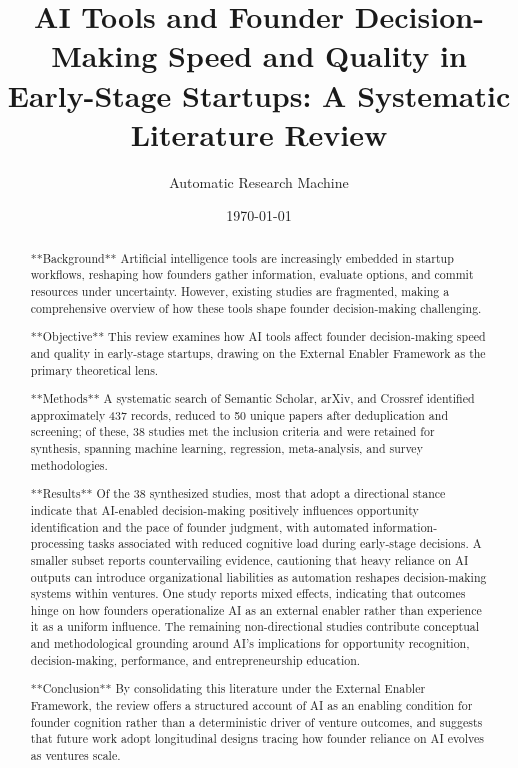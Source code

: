 \documentclass[11pt, a4paper]{article}
\title{AI Tools and Founder Decision-Making Speed and Quality in Early-Stage Startups: A Systematic Literature Review}
\author{Automatic Research Machine}
\date{\today}
\begin{document}
\maketitle

\begin{abstract}
**Background** Artificial intelligence tools are increasingly embedded in startup workflows, reshaping how founders gather information, evaluate options, and commit resources under uncertainty. However, existing studies are fragmented, making a comprehensive overview of how these tools shape founder decision-making challenging.

**Objective** This review examines how AI tools affect founder decision-making speed and quality in early-stage startups, drawing on the External Enabler Framework as the primary theoretical lens.

**Methods** A systematic search of Semantic Scholar, arXiv, and Crossref identified approximately 437 records, reduced to 50 unique papers after deduplication and screening; of these, 38 studies met the inclusion criteria and were retained for synthesis, spanning machine learning, regression, meta-analysis, and survey methodologies.

**Results** Of the 38 synthesized studies, most that adopt a directional stance indicate that AI-enabled decision-making positively influences opportunity identification and the pace of founder judgment, with automated information-processing tasks associated with reduced cognitive load during early-stage decisions. A smaller subset reports countervailing evidence, cautioning that heavy reliance on AI outputs can introduce organizational liabilities as automation reshapes decision-making systems within ventures. One study reports mixed effects, indicating that outcomes hinge on how founders operationalize AI as an external enabler rather than experience it as a uniform influence. The remaining non-directional studies contribute conceptual and methodological grounding around AI's implications for opportunity recognition, decision-making, performance, and entrepreneurship education.

**Conclusion** By consolidating this literature under the External Enabler Framework, the review offers a structured account of AI as an enabling condition for founder cognition rather than a deterministic driver of venture outcomes, and suggests that future work adopt longitudinal designs tracing how founder reliance on AI evolves as ventures scale.
\end{abstract}
\end{document}
